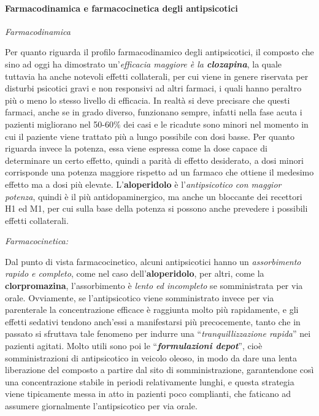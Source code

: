 \paragraph{Farmacodinamica e farmacocinetica degli antipsicotici}

\emph{\emph{Farmacodinamica}}

Per quanto riguarda il profilo farmacodinamico degli antipsicotici, il
composto che sino ad oggi ha dimostrato un'\emph{efficacia maggiore è la
\textbf{clozapina}}, la quale tuttavia ha anche notevoli effetti
collaterali, per cui viene in genere riservata per disturbi psicotici
gravi e non responsivi ad altri farmaci, i quali hanno peraltro più o
meno lo stesso livello di efficacia. In realtà si deve precisare che
questi farmaci, anche se in grado diverso, funzionano sempre, infatti
nella fase acuta i pazienti migliorano nel 50-60\% dei casi e le
ricadute sono minori nel momento in cui il paziente viene trattato più a
lungo possibile con dosi basse. Per quanto riguarda invece la potenza,
essa viene espressa come la dose capace di determinare un certo effetto,
quindi a parità di effetto desiderato, a dosi minori corrisponde una
potenza maggiore rispetto ad un farmaco che ottiene il medesimo effetto
ma a dosi più elevate. L'\textbf{aloperidolo} è l'\emph{antipsicotico
con maggior potenza}, quindi è il più antidopaminergico, ma anche un
bloccante dei recettori H1 ed M1, per cui sulla base della potenza si
possono anche prevedere i possibili effetti collaterali.

\emph{\emph{Farmacocinetica:}}

Dal punto di vista farmacocinetico, alcuni antipsicotici hanno un
\emph{assorbimento rapido e completo}, come nel caso
dell'\textbf{aloperidolo}, per altri, come la \textbf{clorpromazina},
l'assorbimento è \emph{lento ed incompleto} se somministrata per via
orale. Ovviamente, se l'antipsicotico viene somministrato invece per via
parenterale la concentrazione efficace è raggiunta molto più
rapidamente, e gli effetti sedativi tendono anch'essi a manifestarsi più
precocemente, tanto che in passato si sfruttava tale fenomeno per
indurre una ``\emph{tranquillizzazione rapida}'' nei pazienti agitati.
Molto utili sono poi le ``\textbf{\emph{formulazioni depot}}'', cioè
somministrazioni di antipsicotico in veicolo oleoso, in modo da dare una
lenta liberazione del composto a partire dal sito di somministrazione,
garantendone così una concentrazione stabile in periodi relativamente
lunghi, e questa strategia viene tipicamente messa in atto in pazienti
poco complianti, che faticano ad assumere giornalmente l'antipsicotico
per via orale.

